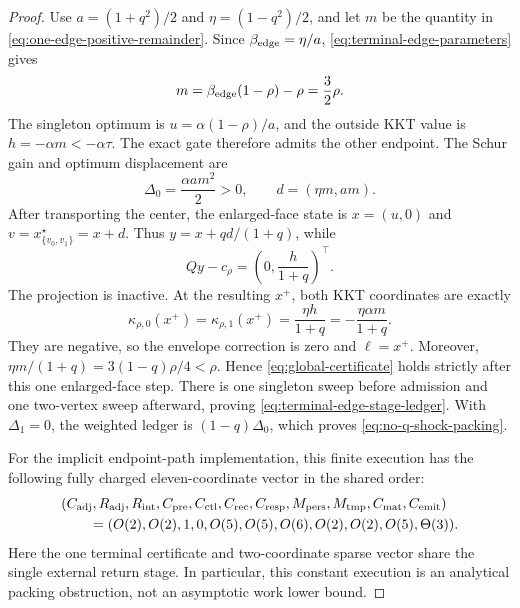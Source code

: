 \begin{proof}
Use $a=(1+q^2)/2$ and $\eta=(1-q^2)/2$, and let $m$ be the quantity in
\cref{eq:one-edge-positive-remainder}.  Since
$\beta_{\rm edge}=\eta/a$,
\cref{eq:terminal-edge-parameters} gives
\begin{equation}
 m=\beta_{\rm edge}(1-\rho)-\rho=\frac32\rho.
 \label{eq:terminal-edge-m}
\end{equation}
The singleton optimum is $u=\alpha(1-\rho)/a$, and the outside KKT value is
$h=-\alpha m< -\alpha\tau$.  The exact gate therefore admits the other
endpoint.  The Schur gain and optimum displacement are
\begin{equation*}
 \Delta_0=\frac{\alpha a m^2}{2}>0,
 \qquad
 d=(\eta m,am).
\end{equation*}
After transporting the center, the enlarged-face state is
$x=(u,0)$ and $v=x_{\{v_0,v_1\}}^\star=x+d$.  Thus
$y=x+qd/(1+q)$, while
\begin{equation*}
 Qy-c_\rho=\left(0,\frac{h}{1+q}\right)^\top.
\end{equation*}
The projection is inactive.  At the resulting $x^+$, both KKT coordinates
are exactly
\begin{equation}
 \kappa_{\rho,0}(x^+)=\kappa_{\rho,1}(x^+)
 =\frac{\eta h}{1+q}
 =-\frac{\eta\alpha m}{1+q}.
 \label{eq:terminal-edge-final-kkt}
\end{equation}
They are negative, so the envelope correction is zero and $\ell=x^+$.
Moreover,
$\eta m/(1+q)=3(1-q)\rho/4<\rho$.  Hence
\cref{eq:global-certificate} holds strictly after this
one enlarged-face step.  There is one singleton sweep before admission and
one two-vertex sweep afterward, proving
\cref{eq:terminal-edge-stage-ledger}.  With
$\Delta_1=0$, the weighted ledger is $(1-q)\Delta_0$, which proves
\cref{eq:no-q-shock-packing}.

For the implicit endpoint-path implementation, this finite execution has
the following fully charged eleven-coordinate vector in the shared order:
\begin{equation}
 \begin{aligned}
 &(C_{\rm adj},R_{\rm adj},R_{\rm int},C_{\rm pre},C_{\rm ctl},C_{\rm rec},
 C_{\rm resp},M_{\rm pers},M_{\rm tmp},C_{\rm mat},C_{\rm emit})\\
 &\qquad=(O(2),O(2),1,0,O(5),O(5),O(6),
             O(2),O(2),O(5),\Theta(3)).
 \end{aligned}
 \label{eq:terminal-edge-eleven-vector}
\end{equation}
Here the one terminal certificate and two-coordinate sparse vector share the
single external return stage.  In particular, this constant execution is an
analytical packing obstruction, not an asymptotic work lower bound.
\end{proof}

